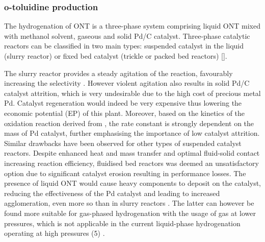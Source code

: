 
\subsubsection{o-toluidine production} \label{sec:otol}

The hydrogenation of ONT is a three-phase system comprising liquid ONT mixed with methanol solvent, gaseous  and solid Pd/C catalyst. Three-phase catalytic reactors can be classified in two main types: suspended catalyst in the liquid (slurry reactor) or fixed bed catalyst (trickle or packed bed reactors) []. 

The slurry reactor provides a steady agitation of the reaction, favourably increasing the selectivity \cite{p_a_ramachandran_recent_1987}. However violent agitation also results in solid Pd/C catalyst attrition, which is very undesirable due to the high cost of precious metal Pd. Catalyst regeneration would indeed be very expensive thus lowering the economic potential (EP) of this plant. Moreover, based on the kinetics of the oxidation reaction derived from  \textcite{rajadhyaksha_solvent_1986}, the rate constant is strongly dependent on the mass of Pd catalyst, further emphasising the importance of low catalyst attrition. Similar drawbacks have been observed for other types of suspended catalyst reactors. Despite enhanced heat and mass transfer and optimal fluid-solid contact increasing reaction efficiency, fluidised bed reactors was deemed an unsatisfactory option due to significant catalyst erosion resulting in performance losses. The presence of liquid ONT would cause heavy components to deposit on the catalyst, reducing the effectiveness of the Pd catalyst and leading to increased agglomeration, even more so than in slurry reactors \cite{farrell_kinetics_1979}. The latter can however be found more suitable for gas-phased hydrogenation with the usage of  gas at lower pressures, which is not applicable in the current liquid-phase hydrogenation operating at high pressures (\SI{5}{\atm}) \cite{ranade_chapter_2011}.

